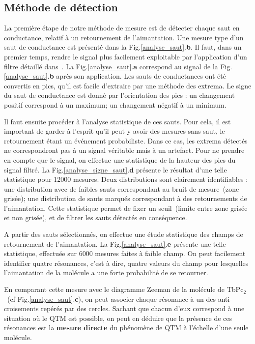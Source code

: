 \subsection{Méthode de détection}
La première étape de notre méthode de mesure est de détecter chaque saut en conductance, relatif à un retournement de l'aimantation. Une mesure type d'un saut de conductance est présenté dans la Fig.\ref{analyse_saut}.\textbf{b}. Il faut, dans un premier temps, rendre le signal plus facilement exploitable par l'application d'un filtre détaillé dans~\cite{Y.1995}. La Fig.\ref{analyse_saut}.\textbf{a} correspond au signal de la Fig.\ref{analyse_saut}.\textbf{b} après son application. Les sauts de conductances ont été convertis en pics, qu'il est facile d'extraire par une méthode des extrema. Le signe du saut de conductance est donné par l'orientation des pics : un changement positif correspond à un maximum; un changement négatif à un minimum.

Il faut ensuite procéder à l'analyse statistique de ces sauts. Pour cela, il est important de garder à l'esprit qu'il peut y avoir des mesures sans saut, le retournement étant un événement probabiliste. Dans ce cas, les extrema détectés ne correspondront pas à un signal véritable mais à un artefact. Pour ne prendre en compte que le signal, on effectue une statistique de la hauteur des pics du signal filtré. La Fig.\ref{analyse_signe_saut}.\textbf{d} présente le résultat d'une telle statistique pour 12000 mesures. Deux distributions sont clairement identifiables : une distribution avec de faibles sauts correspondant au bruit de mesure~(zone grisée); une distribution de sauts marqués correspondant à des retournements de l'aimantation. Cette statistique permet de fixer un seuil~(limite entre zone grisée et non grisée), et de filtrer les sauts détectés en conséquence.

A partir des sauts sélectionnés, on effectue une étude statistique des champs de retournement de l'aimantation. La Fig.\ref{analyse_saut}.\textbf{e} présente une telle statistique, effectuée sur 6000 mesures faites à faible champ. On peut facilement identifier quatre résonances, c'est à dire, quatre valeurs du champ pour lesquelles l'aimantation de la molécule a une forte probabilité de se retourner. 

En comparant cette mesure avec le diagramme Zeeman de la molécule de TbPc$_2$~(cf Fig.\ref{analyse_saut}.\textbf{c}), on peut associer chaque résonance à un des anti-croisements repérés par des cercles. Sachant que chacun d'eux correspond à une situation où le QTM est possible, on peut en déduire que la présence de ces résonances est la \textbf{mesure directe} du phénomène de QTM à l'échelle d'une seule molécule. 

